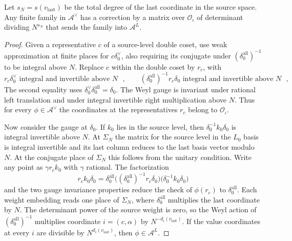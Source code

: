 \begin{lemma}
\label{lem:a-level-diagonal-colength}
\emitthmsource
Let $s_N=s(v_{\mathrm{last}})$ be the total degree of the last coordinate in the source space. Any finite family in $\mathcal A^\vee$ has a correction by a matrix over $\mathcal O_\iota$ of determinant dividing $N^{s_N}$ that sends the family into $\mathcal A^L$.
\end{lemma}
\begin{proof}
Given a representative $c$ of a source-level double coset, use weak approximation at finite places for $c\delta_0^\vee$, also requiring its conjugate under $(\delta_0^{\mathrm{all}})^{-1}$ to be integral above $N$. Replace $c$ within the double coset by $r_c$, with
\[
 r_c\delta_0^\vee\text{ integral and invertible above }N\text{ },\qquad
 (\delta_0^{\mathrm{all}})^{-1}r_c\delta_0\text{ integral and invertible above }N\text{ },
\]
The second equality uses $\delta_0^\vee \delta_0^{\mathrm{all}}=\delta_0$. The Weyl gauge is invariant under rational left translation and under integral invertible right multiplication above $N$. Thus for every $\phi\in\mathcal A^\vee$ the coordinates at the representatives $r_c$ belong to $\mathcal O_\iota$.

Now consider the gauge at $\delta_0$. If $k_0$ lies in the source level, then $\delta_0^{-1}k_0\delta_0$ is integral invertible above $N$. At $\Sigma_N$ the matrix for the source level in the $L_0$ basis is integral invertible and its last column reduces to the last basis vector modulo $N$. At the conjugate place of $\Sigma_N$ this follows from the unitary condition. Write any point as $\gamma r_ck_0$ with $\gamma$ rational. The factorization
\[
 r_ck_0\delta_0
   =\delta_0^{\mathrm{all}}\bigl((\delta_0^{\mathrm{all}})^{-1}r_c\delta_0\bigr)
                  \bigl(\delta_0^{-1}k_0\delta_0\bigr)
\]
and the two gauge invariance properties reduce the check of $\phi(r_c)$ to $\delta_0^{\mathrm{all}}$. Each weight embedding reads one place of $\Sigma_N$, where $\delta_0^{\mathrm{all}}$ multiplies the last coordinate by $N$. The determinant power of the source weight is zero, so the Weyl action of $(\delta_0^{\mathrm{all}})^{-1}$ multiplies coordinate $i=(c,\alpha)$ by $N^{-d_i(v_{\mathrm{last}})}$. If the value coordinates at every $i$ are divisible by $N^{d_i(v_{\mathrm{last}})}$, then $\phi\in\mathcal A^L$.


\end{proof}
